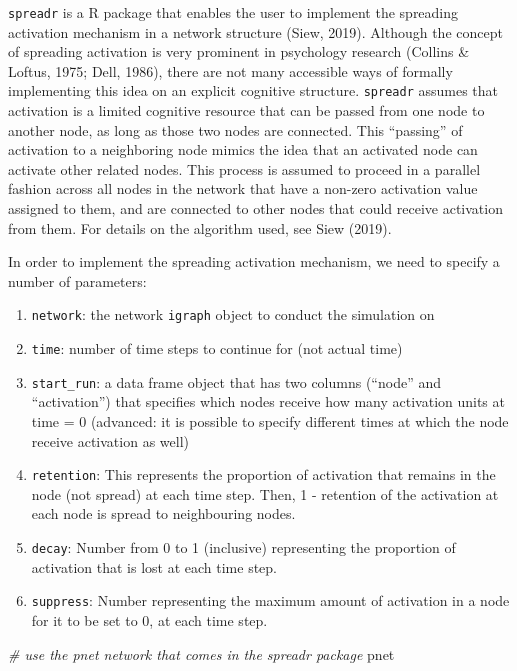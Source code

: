 \documentclass[
]{book}
\newenvironment{Shaded}{\begin{snugshade}}{\end{snugshade}}
\newcommand{\CommentTok}[1]{\textcolor[rgb]{0.56,0.35,0.01}{\textit{#1}}}
\newcommand{\NormalTok}[1]{#1}
\providecommand{\tightlist}{%
  \setlength{\itemsep}{0pt}\setlength{\parskip}{0pt}}
\begin{document}
\texttt{spreadr} is a R package that enables the user to implement the spreading activation mechanism in a network structure (Siew, 2019). Although the concept of spreading activation is very prominent in psychology research (Collins \& Loftus, 1975; Dell, 1986), there are not many accessible ways of formally implementing this idea on an explicit cognitive structure. \texttt{spreadr} assumes that activation is a limited cognitive resource that can be passed from one node to another node, as long as those two nodes are connected. This ``passing'' of activation to a neighboring node mimics the idea that an activated node can activate other related nodes. This process is assumed to proceed in a parallel fashion across all nodes in the network that have a non-zero activation value assigned to them, and are connected to other nodes that could receive activation from them. For details on the algorithm used, see Siew (2019).

In order to implement the spreading activation mechanism, we need to specify a number of parameters:

\begin{enumerate}
\def\labelenumi{\arabic{enumi}.}
\tightlist
\item
  \texttt{network}: the network \texttt{igraph} object to conduct the simulation on
\item
  \texttt{time}: number of time steps to continue for (not actual time)
\item
  \texttt{start\_run}: a data frame object that has two columns (``node'' and ``activation'') that specifies which nodes receive how many activation units at time = 0 (advanced: it is possible to specify different times at which the node receive activation as well)
\item
  \texttt{retention}: This represents the proportion of activation that remains in the node (not spread) at each time step. Then, 1 - retention of the activation at each node is spread to neighbouring nodes.
\item
  \texttt{decay}: Number from 0 to 1 (inclusive) representing the proportion of activation that is lost at each time step.
\item
  \texttt{suppress}: Number representing the maximum amount of activation in a node for it to be set to 0, at each time step.
\end{enumerate}

\begin{Shaded}
\begin{Highlighting}[]
\CommentTok{\# use the pnet network that comes in the spreadr package}
\NormalTok{pnet}
\end{Highlighting}
\end{Shaded}
\end{document}
